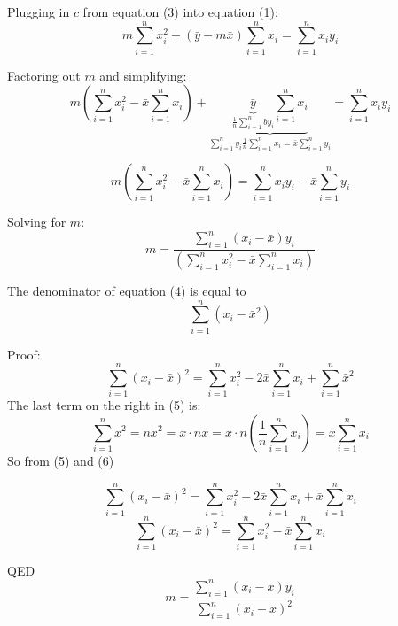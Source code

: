\documentclass{article}
\begin{document}
Plugging in $c$ from equation (3) into equation (1):
$$m\sum\limits_{i = 1}^n {x_i^2 + \left( {\bar y - m\bar x} \right)\sum\limits_{i = 1}^n {{x_i}} }  = \sum\limits_{i = 1}^n {{x_i}{y_i}}  $$


Factoring out $m$ and simplifying:
$$m\left( {\sum\limits_{i = 1}^n {x_i^2 - \bar x\sum\limits_{i = 1}^n {{x_i}} } } \right) + \underbrace {\underbrace {\bar y}_{\frac{1}{n}\sum\limits_{i = 1}^n b{{y_i}} }\sum\limits_{i = 1}^n {{x_i}} }_{\sum\limits_{i = 1}^n {{y_i}} \frac{1}{n}\sum\limits_{i = 1}^n {{x_i}}  = \bar x\sum\limits_{i = 1}^n {{y_i}} } = \sum\limits_{i = 1}^n {{x_i}{y_i}} $$

$$m\left( {\sum\limits_{i = 1}^n {x_i^2 - \bar x\sum\limits_{i = 1}^n {{x_i}} } } \right) = \sum\limits_{i = 1}^n {{x_i}{y_i}}  - \bar x\sum\limits_{i = 1}^n {{y_i}} $$

Solving for $m$:
\begin{equation}
m = \frac{{\sum\limits_{i = 1}^n {\left( {{x_i} - \bar x} \right){y_i}} }}{{\left( {\sum\limits_{i = 1}^n {x_i^2 - \bar x\sum\limits_{i = 1}^n {{x_i}} } } \right)}}
\end{equation}

The denominator of equation (4) is equal to 
$$\sum\limits_{i = 1}^n {\left( {{x_i} - {{\bar x}^2}} \right)} $$

Proof:
\begin{equation}
\sum\limits_{i = 1}^n {{{\left( {{x_i} - \bar x} \right)}^2}}  = \sum\limits_{i = 1}^n {x_i^2}  - 2\bar x\sum\limits_{i = 1}^n {{x_i}}  + \sum\limits_{i = 1}^n {{{\bar x}^2}}
\end{equation}
The last term on the right in (5) is:
\begin{equation}
\sum\limits_{i = 1}^n {{{\bar x}^2}}  = n{{\bar x}^2} = \bar x \cdot n\bar x = \bar x \cdot n\left( {\frac{1}{n}\sum\limits_{i = 1}^n {{x_i}} } \right) = \bar x\sum\limits_{i = 1}^n {{x_i}} 
\end{equation}
So from (5) and (6)

$$\sum\limits_{i = 1}^n {{{\left( {{x_i} - \bar x} \right)}^2}}  = \sum\limits_{i = 1}^n {x_i^2}  - 2\bar x\sum\limits_{i = 1}^n {{x_i}}  + \bar x\sum\limits_{i = 1}^n {{x_i}}$$
\begin{equation}
\sum\limits_{i = 1}^n {{{\left( {{x_i} - \bar x} \right)}^2}} = \sum\limits_{i = 1}^n {x_i^2}  - \bar x\sum\limits_{i = 1}^n {{x_i}} 
\end{equation}

QED
\begin{equation}
m = \frac{{\sum\limits_{i = 1}^n {\left( {{x_i} - \bar x} \right){y_i}} }}{{\sum\limits_{i = 1}^n {{{\left( {{x_i} - x} \right)}^2}} }}
\end{equation}
\end{document}
